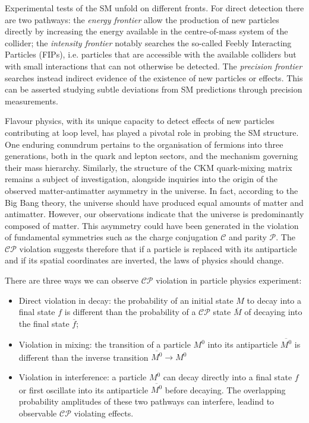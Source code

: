 
Experimental tests of the SM unfold on different fronts.
For direct detection there are two pathways: 
the \textit{energy frontier} allow the production of new particles directly by increasing the energy available in the centre-of-mass system of the collider; the \textit{intensity frontier} notably searches the so-called Feebly Interacting Particles (FIPs), i.e. particles that are accessible with the available colliders but with small interactions that can not otherwise be detected.  
The \textit{precision frontier} searches instead indirect evidence of the existence of new particles or effects. This can be asserted studying subtle deviations from SM predictions through precision measurements. 

Flavour physics, with its unique capacity to detect effects of new particles contributing at loop level, has played a pivotal role in probing the SM structure. One enduring conundrum pertains to the organisation of fermions into three generations, both in the quark and lepton sectors, and the mechanism governing their mass hierarchy. Similarly, the structure of the CKM quark-mixing matrix remains a subject of investigation, alongside inquiries into the origin of the observed matter-antimatter asymmetry in the universe. In fact, according to the Big Bang theory, the universe should have produced equal amounts of matter and antimatter. However, our observations indicate that the universe is predominantly composed of matter. This asymmetry could have been generated in the violation of fundamental symmetries such as the charge conjugation $\mathcal{C}$ and parity $\mathcal{P}$. The $\mathcal{CP}$ violation suggests therefore that if a particle is replaced with its antiparticle and if its spatial coordinates are inverted, the laws of physics should change. 

There are three ways we can observe $\mathcal{CP}$ violation in particle physics experiment:
 \begin{itemize}
     \item Direct violation in decay: the probability of an initial state $M$ to decay into a final state $f$ is different than the probability of a $\mathcal{CP}$ state $\overline{M}$ of decaying into the final state $\overline{f}$;
     \item Violation in mixing: the transition of a particle $M^0$ into its antiparticle $\overline{M^0}$ is different than the inverse transition $\overline{M^0}\longrightarrow M^0$
     \item Violation in interference: a particle $M^0$ can decay directly into a final state $f$ or first oscillate into its antiparticle $\overline{M^0}$ before decaying. The overlapping probability amplitudes of these two pathways can interfere, leadind to observable $\mathcal{CP}$ violating effects.
 \end{itemize}
 
